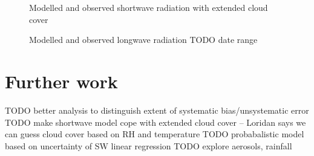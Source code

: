 \documentclass[a4paper,titlepage, twoside]{report}
\begin{document}
\begin{figure}
\centering

\caption{Modelled and observed shortwave radiation with extended cloud cover}
\label{fig:extended-cloud}
\end{figure}

\begin{figure}
\centering

\caption{Modelled and observed longwave radiation TODO date range}
\label{fig:longwave-verification}
\end{figure}

\section{Further work}
\label{sec:further-work}
TODO better analysis to distinguish extent of systematic bias/unsystematic error
TODO make shortwave model cope with extended cloud cover -- Loridan says we can guess cloud cover based on RH and temperature
TODO probabalistic model based on uncertainty of SW linear regression
TODO explore aerosols, rainfall


\printbibliography
\end{document}
